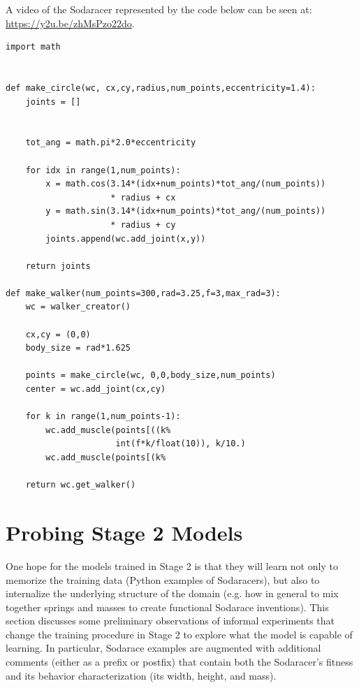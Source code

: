 \documentclass{article}
\begin{document}
A video of the Sodaracer represented by the code below can be seen at: \url{https://y2u.be/zhMsPzo22do}.



\begin{verbatim}
import math


def make_circle(wc, cx,cy,radius,num_points,eccentricity=1.4):
    joints = []


    tot_ang = math.pi*2.0*eccentricity

    for idx in range(1,num_points):
        x = math.cos(3.14*(idx+num_points)*tot_ang/(num_points)) 
                     * radius + cx
        y = math.sin(3.14*(idx+num_points)*tot_ang/(num_points)) 
                     * radius + cy
        joints.append(wc.add_joint(x,y))

    return joints

def make_walker(num_points=300,rad=3.25,f=3,max_rad=3):
    wc = walker_creator()

    cx,cy = (0,0)
    body_size = rad*1.625

    points = make_circle(wc, 0,0,body_size,num_points)
    center = wc.add_joint(cx,cy)

    for k in range(1,num_points-1):
        wc.add_muscle(points[((k%
                      int(f*k/float(10)), k/10.)
        wc.add_muscle(points[(k%

    return wc.get_walker()
\end{verbatim}

\section{Probing Stage 2 Models}
\label{appendix:probing}

One hope for the models trained in Stage 2 is that they will learn not
only to memorize the training data (Python examples of Sodaracers), but also to internalize the underlying structure of the domain (e.g. how in general to mix together springs and masses to create functional Sodarace inventions). 
This section discusses some preliminary observations of informal experiments that change the training procedure in Stage 2 to explore what the model is capable of learning. In particular,
Sodarace examples are augmented with additional comments (either as a prefix or postfix) that contain both the Sodaracer's fitness and its behavior characterization (its width, height, and mass).
\end{document}
